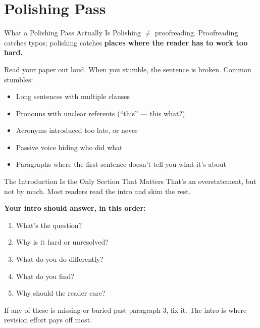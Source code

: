 \section{Polishing Pass}

\begin{frame}{What a Polishing Pass Actually Is}
  Polishing $\ne$ proofreading. Proofreading catches typos; polishing catches \textbf{places where the reader has to work too hard.}

  \vspace{8pt}

  Read your paper out loud. When you stumble, the sentence is broken. Common stumbles:

  \vspace{6pt}

  \begin{itemize}\setlength\itemsep{2pt}
    \item Long sentences with multiple clauses
    \item Pronouns with unclear referents (``this'' --- this what?)
    \item Acronyms introduced too late, or never
    \item Passive voice hiding who did what
    \item Paragraphs where the first sentence doesn't tell you what it's about
  \end{itemize}
\end{frame}

\begin{frame}{The Introduction Is the Only Section That Matters}
  That's an overstatement, but not by much. Most readers read the intro and skim the rest.

  \vspace{8pt}

  \textbf{Your intro should answer, in this order:}

  \begin{enumerate}\setlength\itemsep{1pt}
    \item What's the question?
    \item Why is it hard or unresolved?
    \item What do you do differently?
    \item What do you find?
    \item Why should the reader care?
  \end{enumerate}

  \vspace{8pt}

  If any of these is missing or buried past paragraph 3, fix it. The intro is where revision effort pays off most.
\end{frame}

